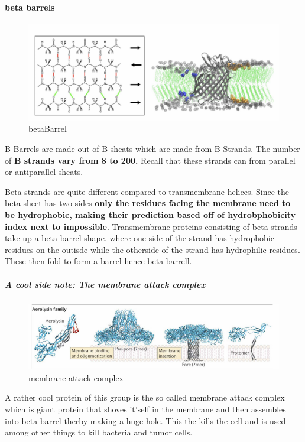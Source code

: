 \documentclass[../main.tex]{subfiles}
\begin{document}
\paragraph{beta barrels}

\begin{figure}[H]
    \centering
    \includegraphics[width=0.5\linewidth]{Sum_Cell_Bio_II//lectures//cbII2/BBarrel.png}
    \caption{\gls{betaBarrel}}
    \label{fig:enter-label}
\end{figure}

B-Barrels are made out of B sheats which are made from B Strands. The number of \textbf{B strands vary from 8 to 200.}  Recall that these strands can from parallel or antiparallel sheats.
\par
Beta strands are quite different compared to transmembrane helices. Since the beta sheet has two sides \textbf{only the residues facing the membrane need to be hydrophobic, making their prediction based off of hydrobphobicity index next to impossible}. Transmembrane proteins consisting of beta strands take up a beta barrel shape. where one side of the strand has hydrophobic residues on the outisde while the otherside of the strand has hydrophilic residues. These then fold to form a barrel hence beta barrell.

\subparagraph{A cool side note: The membrane attack complex}

\begin{figure}[H]
    \centering
    \includegraphics[width=0.5\linewidth]{MAC.png}
    \caption{membrane attack complex}
    \label{fig:enter-label}
\end{figure}

A rather cool protein of this group is the so called membrane attack complex which is giant protein that shoves it'self in the membrane and then assembles into beta barrel therby making a huge hole. This the kills the cell and is used among other things to kill bacteria and tumor cells.
\end{document}
